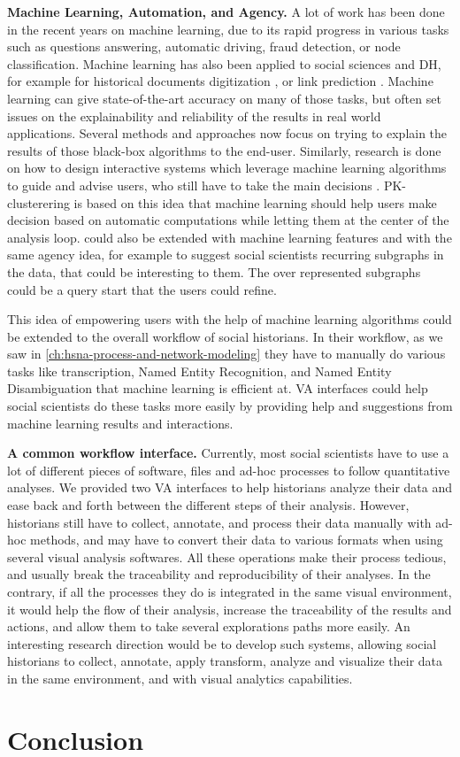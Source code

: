 \noindent\textbf{Machine Learning, Automation, and Agency.} A lot of work has been done in the recent years on machine learning, due to its rapid progress in various tasks such as questions answering, automatic driving, fraud detection, or node classification.
Machine learning has also been applied to social sciences and DH, for example for historical documents digitization \cite{philipsHistoricalDocumentProcessing2020}, or link prediction \cite{michalskiPredictingSocialNetwork2012}.
Machine learning can give state-of-the-art accuracy on many of those tasks, but often set issues on the explainability and reliability of the results in real world applications.
Several methods and approaches now focus on trying to explain the results of those black-box algorithms to the end-user.
Similarly, research is done on how to design interactive systems which leverage machine learning algorithms to guide and advise users, who still have to take the main decisions \cite{heerAgencyAutomationDesigning2019}.
PK-clusterering is based on this idea that machine learning should help users make decision based on automatic computations while letting them at the center of the analysis loop.
\name could also be extended with machine learning features and with the same agency idea, for example to suggest social scientists recurring subgraphs in the data, that could be interesting to them.
The over represented subgraphs could be a query start that the users could refine.

This idea of empowering users with the help of machine learning algorithms could be extended to the overall workflow of social historians.
In their workflow, as we saw in \autoref{ch:hsna-process-and-network-modeling} they have to manually do various tasks like transcription, Named Entity Recognition, and Named Entity Disambiguation that machine learning is efficient at.
VA interfaces could help social scientists do these tasks more easily by providing help and suggestions from  machine learning results and interactions.


\noindent\textbf{A common workflow interface.} Currently, most social scientists have to use a lot of different pieces of software, files and ad-hoc processes to follow quantitative analyses.
We provided two VA interfaces to help historians analyze their data and ease back and forth between the different steps of their analysis.
However, historians still have to collect, annotate, and process their data manually with ad-hoc methods, and may have to convert their data to various formats when using several visual analysis softwares.
All these operations make their process tedious, and usually break the traceability and reproducibility of their analyses.
In the contrary, if all the processes they do is integrated in the same visual environment, it would help the flow of their analysis, increase the traceability of the results and actions, and allow them to take several explorations paths more easily.
An interesting research direction would be to develop such systems, allowing social historians to collect, annotate, apply transform, analyze and visualize their data in the same environment, and with visual analytics capabilities.



\section{Conclusion}

